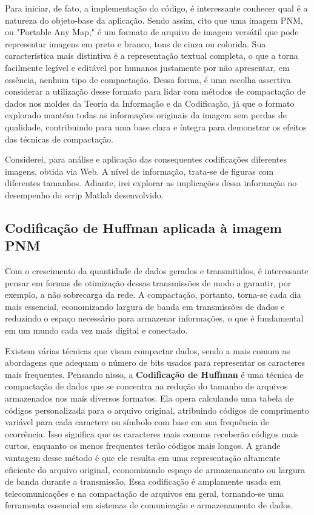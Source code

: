 \documentclass{article}
\begin{document}
Para iniciar, de fato, a implementação do código, é interessante conhecer qual é a natureza do objeto-base da aplicação. Sendo assim, cito que uma imagem PNM, ou "Portable Any Map," é um formato de arquivo de imagem versátil que pode representar imagens em preto e branco, tons de cinza ou colorida. Sua característica mais distintiva é a representação textual completa, o que a torna facilmente legível e editável por humanos justamente por não apresentar, em essência, nenhum tipo de compactação. Dessa forma, é uma escolha assertiva considerar a utilização desse formato para lidar com métodos de compactação de dados nos moldes da Teoria da Informação e da Codificação, já que o formato explorado mantém todas as informações originais da imagem sem perdas de qualidade, contribuindo para uma base clara e íntegra para demonstrar os efeitos das técnicas de compactação.

Considerei, para análise e aplicação das consequentes codificações diferentes imagens, obtida via Web. A nível de informação, trata-se de figuras com diferentes tamanhos. Adiante, irei explorar as implicações dessa informação no desempenho do scrip Matlab desenvolvido.

\subsection{Codificação de Huffman aplicada à imagem PNM}

Com o crescimento da quantidade de dados gerados e
transmitidos, é interessante pensar em formas de otimização dessas transmissões de modo a garantir, por exemplo, a não sobrecarga da rede. A compactação, portanto, torna-se cada dia mais essencial, economizando largura de banda em transmissões de dados e reduzindo o espaço necessário para armazenar informações, o que é fundamental em um mundo cada vez mais digital e conectado.

Existem várias técnicas que visam compactar dados, sendo a mais comum as abordagens que adequam o número de bits usados para representar os caracteres mais frequentes. Pensando nisso, a \textbf{Codificação de Huffman} é uma técnica de compactação de dados que se concentra na redução do tamanho de arquivos armazenados nos mais diversos formatos. Ela opera calculando uma tabela de códigos personalizada para o arquivo original, atribuindo códigos de comprimento variável para cada caractere ou símbolo com base em sua frequência de ocorrência. Isso significa que os caracteres mais comuns receberão códigos mais curtos, enquanto os menos frequentes terão códigos mais longos. A grande vantagem desse método é que ele resulta em uma representação altamente eficiente do arquivo original, economizando espaço de armazenamento ou largura de banda durante a transmissão. Essa codificação é amplamente usada em telecomunicações e na compactação de arquivos em geral, tornando-se uma ferramenta essencial em sistemas de comunicação e armazenamento de dados.
\end{document}
